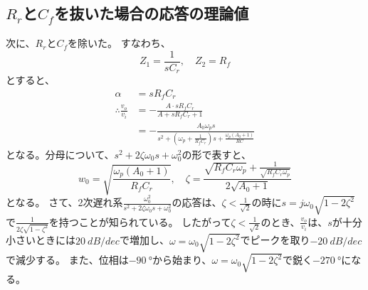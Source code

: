 \documentclass[a4paper]{ltjsarticle}
\begin{document}
\subsection{$R_r$と$C_f$を抜いた場合の応答の理論値}
次に、$R_r$と$C_f$を除いた。
すなわち、
\begin{equation*}
Z_1 = \frac{1}{sC_r},\quad Z_2 = R_f
\end{equation*}
とすると、
\begin{align}
    \alpha &= sR_fC_r \\
    \therefore\frac{v_o}{v_i} &= -\frac{A\cdot sR_fC_r}{A + sR_fC_r + 1} \nonumber \\
    &= -\frac{A_0\omega_p s}{s^2+\left( \omega_p+\frac{1}{R_fC_r} \right)s + \frac{\omega_p(A_0+1)}{RC}}
\end{align}
となる。分母について、$s^2+2\zeta\omega_0 s+\omega_0^2$の形で表すと、
\begin{equation}
    w_0 = \sqrt{\frac{\omega_p(A_0+1)}{R_fC_r}},\quad \zeta = \frac{\sqrt{R_fC_r\omega_p} + \frac{1}{\sqrt{R_fC_r\omega_p}}}{2\sqrt{A_0+1}}
\end{equation}
となる。
さて、2次遅れ系$\frac{\omega_0^2}{s^2+2\zeta\omega_0s+\omega_0^2}$の応答は、$\zeta<\frac{1}{\sqrt{2}}$の時に$s=j\omega_0\sqrt{1-2\zeta^2}$で$\frac{1}{2\zeta\sqrt{1-\zeta^2}}$を持つことが知られている。
したがって$\zeta<\frac{1}{\sqrt{2}}$のとき、$\frac{v_o}{v_i}$は、$s$が十分小さいときには$\SI{20}{dB/dec}$で増加し、$\omega=\omega_0\sqrt{1-2\zeta^2}$でピークを取り$\SI{-20}{dB/dec}$で減少する。
また、位相は$\SI{-90}{\degree}$から始まり、$\omega=\omega_0\sqrt{1-2\zeta^2}$で鋭く$\SI{-270}{\degree}$になる。
\end{document}
